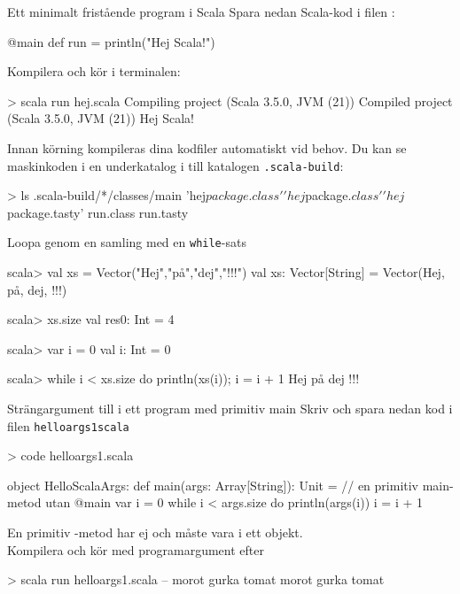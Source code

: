 \begin{Slide}{Ett minimalt fristående program i Scala}\SlideFontSmall
Spara nedan Scala-kod i filen :
\begin{Code}
@main def run = println("Hej Scala!")
\end{Code}

Kompilera och kör i terminalen:
\begin{REPL}
> scala run hej.scala 
Compiling project (Scala 3.5.0, JVM (21))
Compiled project (Scala 3.5.0, JVM (21))
Hej Scala! 
\end{REPL}

Innan körning kompileras dina kodfiler automatiskt vid behov. Du kan se maskinkoden i en underkatalog i till katalogen \texttt{.scala-build}: 
\begin{REPL}
> ls .scala-build/*/classes/main
'hej$package.class'  'hej$package$.class'  'hej$package.tasty'   run.class   run.tasty
\end{REPL}
\end{Slide}


\begin{Slide}{Loopa genom en samling med en \texttt{while}-sats}
\begin{REPLnonum}
scala> val xs = Vector("Hej","på","dej","!!!")
val xs: Vector[String] =
  Vector(Hej, på, dej, !!!)

scala> xs.size
val res0: Int = 4

scala> var i = 0
val i: Int = 0

scala> while i < xs.size do { println(xs(i)); i = i + 1 }
Hej
på
dej
!!!
\end{REPLnonum}
\end{Slide}


\begin{Slide}{Strängargument till i ett program med primitiv main}
Skriv och spara nedan kod i filen \texttt{helloargs1scala}
\begin{REPLnonum}
> code helloargs1.scala
\end{REPLnonum}
\begin{Code}
object HelloScalaArgs:
  def main(args: Array[String]): Unit = // en primitiv main-metod utan @main
    var i = 0
    while i < args.size do
      println(args(i))
      i = i + 1
\end{Code}
En primitiv -metod har ej  och måste vara i ett objekt. \\
Kompilera och kör med programargument efter \code{--}
\begin{REPL}
> scala run helloargs1.scala -- morot gurka tomat
morot
gurka
tomat
\end{REPL}
\end{Slide}

